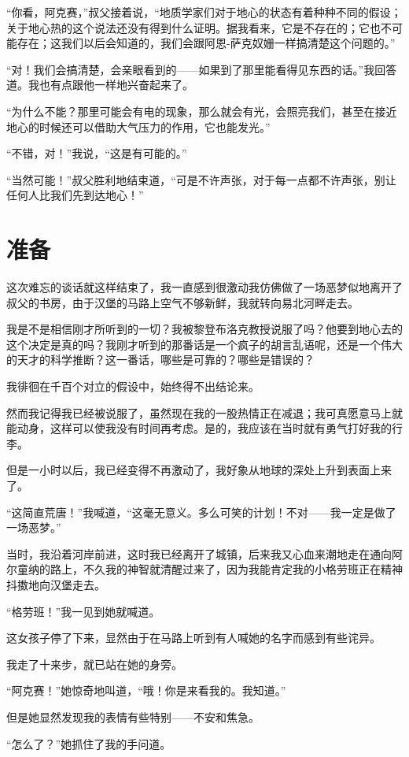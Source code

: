 \documentclass[10pt]{book}
\begin{document}
“你看，阿克赛，”叔父接着说，“地质学家们对于地心的状态有着种种不同的假设；关于地心热的这个说法还没有得到什么证明。据我看来，它是不存在的；它也不可能存在；这我们以后会知道的，我们会跟阿恩-萨克奴姗一样搞清楚这个问题的。”

“对！我们会搞清楚，会亲眼看到的——如果到了那里能看得见东西的话。”我回答道。我也有点跟他一样地兴奋起来了。

“为什么不能？那里可能会有电的现象，那么就会有光，会照亮我们，甚至在接近地心的时候还可以借助大气压力的作用，它也能发光。”

“不错，对！”我说，“这是有可能的。”

“当然可能！”叔父胜利地结束道，“可是不许声张，对于每一点都不许声张，别让任何人比我们先到达地心！”

\chapter{准备}
这次难忘的谈话就这样结束了，我一直感到很激动我仿佛做了一场恶梦似地离开了叔父的书房，由于汉堡的马路上空气不够新鲜，我就转向易北河畔走去。

我是不是相信刚才所听到的一切？我被黎登布洛克教授说服了吗？他要到地心去的这个决定是真的吗？我刚才听到的那番话是一个疯子的胡言乱语呢，还是一个伟大的天才的科学推断？这一番话，哪些是可靠的？哪些是错误的？

我徘徊在千百个对立的假设中，始终得不出结论来。

然而我记得我已经被说服了，虽然现在我的一股热情正在减退；我可真愿意马上就能动身，这样可以使我没有时间再考虑。是的，我应该在当时就有勇气打好我的行李。

但是一小时以后，我已经变得不再激动了，我好象从地球的深处上升到表面上来了。

“这简直荒唐！”我喊道，“这毫无意义。多么可笑的计划！不对——我一定是做了一场恶梦。”

当时，我沿着河岸前进，这时我已经离开了城镇，后来我又心血来潮地走在通向阿尔童纳的路上，不久我的神智就清醒过来了，因为我能肯定我的小格劳班正在精神抖擞地向汉堡走去。

“格劳班！”我一见到她就喊道。

这女孩子停了下来，显然由于在马路上听到有人喊她的名字而感到有些诧异。

我走了十来步，就已站在她的身旁。

“阿克赛！”她惊奇地叫道，“哦！你是来看我的。我知道。”

但是她显然发现我的表情有些特别——不安和焦急。

“怎么了？”她抓住了我的手问道。
\end{document}
